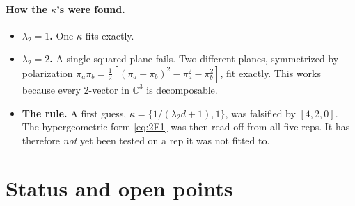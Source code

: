 \documentclass[11pt]{article}
\theoremstyle{definition}
\theoremstyle{remark}
\begin{document}
\paragraph{How the $\kappa$'s were found.}
\begin{itemize}
\item \textbf{$\lambda_2=1$.} One $\kappa$ fits exactly.
\item \textbf{$\lambda_2=2$.} A single squared plane fails. Two different planes, symmetrized by polarization $\pi_a\pi_b=\tfrac12[(\pi_a+\pi_b)^2-\pi_a^2-\pi_b^2]$, fit exactly. This works because every 2-vector in $\mathbb C^3$ is decomposable.
\item \textbf{The rule.} A first guess, $\kappa=\{1/(\lambda_2d+1),1\}$, was falsified by $[4,2,0]$. The hypergeometric form \eqref{eq:2F1} was then read off from all five reps. It has therefore \emph{not} yet been tested on a rep it was not fitted to.
\end{itemize}

\section{Status and open points}
\end{document}
